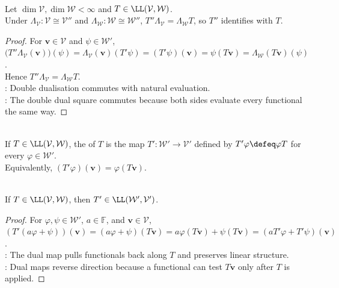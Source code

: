 \begin{corollary} \label{cor:double-dual-map-identifies-with-original-map} \\
Let $\dim\mathcal{V},\dim\mathcal{W}<\infty$ and $T\in\LL(\mathcal{V},\mathcal{W})$.\\
Under $\Lambda_{\mathcal{V}}:\mathcal{V}\cong\mathcal{V}''$ and $\Lambda_{\mathcal{W}}:\mathcal{W}\cong\mathcal{W}''$, $T''\Lambda_{\mathcal{V}}=\Lambda_{\mathcal{W}}T$,  so $T''$ identifies with $T$.
\begin{proof}
For $\mathbf{v}\in\mathcal{V}$ and $\psi\in\mathcal{W}'$, $\bigl(T''\Lambda_{\mathcal{V}}(\mathbf{v})\bigr)(\psi) =\Lambda_{\mathcal{V}}(\mathbf{v})(T'\psi) =(T'\psi)(\mathbf{v}) =\psi(T\mathbf{v}) =\Lambda_{\mathcal{W}}(T\mathbf{v})(\psi)$.\\
Hence $T''\Lambda_{\mathcal{V}}=\Lambda_{\mathcal{W}}T$.\\
: Double dualisation commutes with natural evaluation.\\
: The double dual square commutes because both sides evaluate every functional the same way.
\end{proof}
\end{corollary}

\begin{definition} \label{def:dual-map} \\
If $T\in\LL(\mathcal{V},\mathcal{W})$, the  of $T$ is the map $T':\mathcal{W}'\to\mathcal{V}'$ defined by $T'\varphi \defeq \varphi T$ for every $\varphi\in\mathcal{W}'$.\\
Equivalently, $(T'\varphi)(\mathbf{v})=\varphi(T\mathbf{v})$.
\end{definition}

\begin{proposition} \label{prop:dual-map-is-linear} \\
If $T\in\LL(\mathcal{V},\mathcal{W})$, then $T'\in\LL(\mathcal{W}',\mathcal{V}')$.
\begin{proof}
For $\varphi,\psi\in\mathcal{W}'$, $a\in\mathbb{F}$, and $\mathbf{v}\in\mathcal{V}$, $\left(T'(a\varphi+\psi)\right)(\mathbf{v}) =(a\varphi+\psi)(T\mathbf{v}) =a\varphi(T\mathbf{v})+\psi(T\mathbf{v}) =\left(aT'\varphi+T'\psi\right)(\mathbf{v})$.\\
: The dual map pulls functionals back along $T$ and preserves linear structure.\\
: Dual maps reverse direction because a functional can test $T\mathbf{v}$ only after $T$ is applied.
\end{proof}
\end{proposition}

